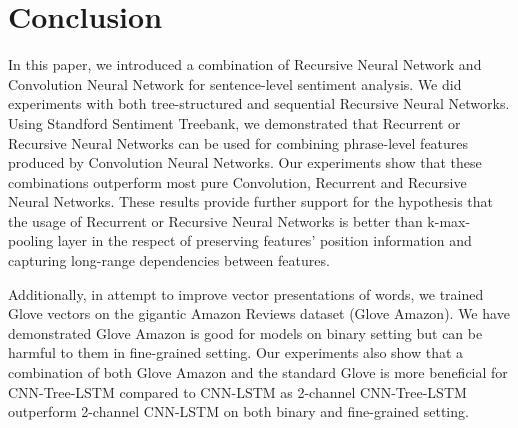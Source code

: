 \section{Conclusion}
In this paper, we introduced a combination of Recursive Neural Network and Convolution Neural Network for sentence-level sentiment analysis.
We did experiments with both tree-structured and sequential Recursive Neural Networks.
Using Standford Sentiment Treebank, we demonstrated that Recurrent or Recursive Neural Networks can be used for combining phrase-level features produced by Convolution Neural Networks.
Our experiments show that these combinations outperform most pure Convolution, Recurrent and Recursive Neural Networks. 
These results provide further support for the hypothesis that the usage of Recurrent or Recursive Neural Networks is better than k-max-pooling layer in the respect of preserving features' position information and capturing long-range dependencies between features. 

Additionally, in attempt to improve vector presentations of words, we trained Glove vectors on the gigantic Amazon Reviews dataset (Glove Amazon).
We have demonstrated Glove Amazon is good for models on binary setting but can be harmful to them in fine-grained setting.
Our experiments also show that a combination of both Glove Amazon and the standard Glove is more beneficial for CNN-Tree-LSTM compared to CNN-LSTM as 2-channel CNN-Tree-LSTM outperform 2-channel CNN-LSTM on both binary and fine-grained setting.

